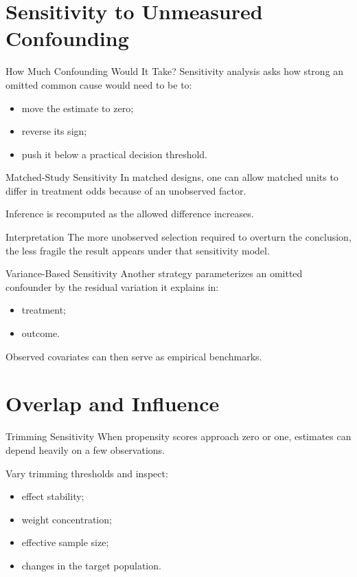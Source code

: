 \documentclass[aspectratio=169,11pt]{beamer}
\begin{document}
\section{Sensitivity to Unmeasured Confounding}

\begin{frame}{How Much Confounding Would It Take?}
Sensitivity analysis asks how strong an omitted common cause would need to be to:
\begin{itemize}
\item move the estimate to zero;
\item reverse its sign;
\item push it below a practical decision threshold.
\end{itemize}
\end{frame}

\begin{frame}{Matched-Study Sensitivity}
In matched designs, one can allow matched units to differ in treatment odds because of an unobserved factor.

Inference is recomputed as the allowed difference increases.

\begin{block}{Interpretation}
The more unobserved selection required to overturn the conclusion, the less fragile the result appears under that sensitivity model.
\end{block}
\end{frame}

\begin{frame}{Variance-Based Sensitivity}
Another strategy parameterizes an omitted confounder by the residual variation it explains in:
\begin{itemize}
\item treatment;
\item outcome.
\end{itemize}

Observed covariates can then serve as empirical benchmarks.
\end{frame}

\section{Overlap and Influence}

\begin{frame}{Trimming Sensitivity}
When propensity scores approach zero or one, estimates can depend heavily on a few observations.

Vary trimming thresholds and inspect:
\begin{itemize}
\item effect stability;
\item weight concentration;
\item effective sample size;
\item changes in the target population.
\end{itemize}
\end{frame}
\end{document}

